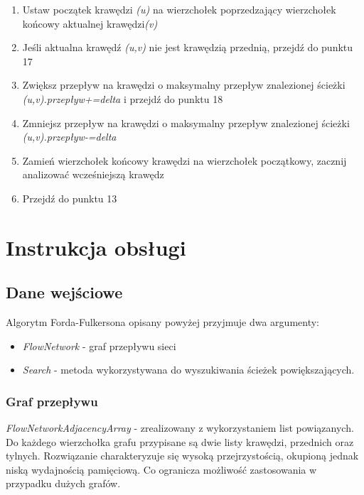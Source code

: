\documentclass[10pt]{minutes}
\begin{document}
\begin{enumerate}
    \item{Ustaw początek krawędzi \emph{(u)} na wierzchołek poprzedzający wierzchołek końcowy aktualnej krawędzi\emph{(v)}}
    \item{Jeśli aktualna krawędź \emph{(u,v)} nie jest krawędzią przednią, przejdź do punktu 17}
    \item{Zwiększ przepływ na krawędzi o maksymalny przepływ znalezionej ścieżki \emph{(u,v).przepływ+=delta} i przejdź do punktu 18}
    \item{Zmniejsz przepływ na krawędzi o maksymalny przepływ znalezionej ścieżki \emph{(u,v).przepływ-=delta}}
    \item{Zamień wierzchołek końcowy krawędzi na wierzchołek początkowy, zacznij analizować wcześniejszą krawędz}
    \item{Przejdź do punktu 13}
  \end{enumerate}


\section{Instrukcja obsługi}
  \subsection{Dane wejściowe}
    Algorytm Forda-Fulkersona opisany powyżej przyjmuje dwa argumenty:
    \begin{itemize}
      \item \emph{FlowNetwork} - graf przepływu sieci
      \item \emph{Search} - metoda wykorzystywana do wyszukiwania ścieżek powiększających.
    \end{itemize}

  \subsubsection{Graf przepływu}
    \emph{FlowNetworkAdjacencyArray} - zrealizowany z wykorzystaniem list powiązanych. Do każdego wierzchołka grafu przypisane są dwie listy krawędzi, przednich oraz tylnych. Rozwiązanie charakteryzuje się wysoką przejrzystością, okupioną jednak niską 
wydajnością pamięciową. Co ogranicza możliwość zastosowania w przypadku dużych grafów.
\end{document}
